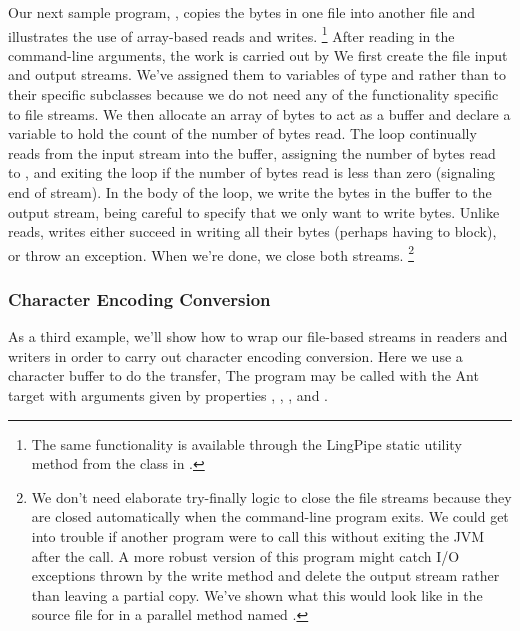 Our next sample program, , copies the bytes in one file
into another file and illustrates the use of array-based reads and
writes.%
%
\footnote{The same functionality is available through the LingPipe
static utility method  from the 
class in .}
%
After reading in the command-line arguments, the work is carried out by
%
%
We first create the file input and output streams.  We've assigned
them to variables of type  and 
rather than to their specific subclasses because we do not need any of
the functionality specific to file streams.  We then allocate an array
 of bytes to act as a buffer and declare a variable  to hold
the count of the number of bytes read.  The loop continually reads
from the input stream into the buffer, assigning the number of bytes
read to , and exiting the loop if the number of bytes read is
less than zero (signaling end of stream).  In the body of the loop, we
write the bytes in the buffer to the output stream, being careful to
specify that we only want to write  bytes.  Unlike reads,
writes either succeed in writing all their bytes (perhaps having to
block), or throw an exception.  When we're done, we close both streams.%
%
\footnote{We don't need elaborate try-finally logic to close
the file streams because they are closed automatically when the
command-line program exits.  We could get into trouble if another
program were to call this  without exiting the JVM after
the call.  A more robust version of this program might catch I/O
exceptions thrown by the write method and delete the output stream
rather than leaving a partial copy.  We've shown what this would look
like in the source file for  in a parallel method
named .}

\subsubsection{Character Encoding Conversion}

As a third example, we'll show how to wrap our file-based streams
in readers and writers in order to carry out character encoding
conversion.  Here we use a character buffer to do the transfer,
%
%
The program may be called with the Ant target
 with arguments given by
properties , , ,
and .  




